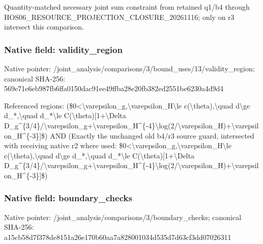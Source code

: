 \documentclass[10pt,a4paper]{article}
\begin{document}
\begingroup\raggedright\sloppy Quantity-matched necessary joint sum constraint from retained q1/\allowbreak{}b4 through HOS06\_\allowbreak{}RESOURCE\_\allowbreak{}PROJECTION\_\allowbreak{}CLOSURE\_\allowbreak{}20261116;\allowbreak{} only on r3 intersect this comparison.\par\endgroup

\subsubsection{Native field: validity\_\allowbreak{}region}
Native pointer: /joint\_\allowbreak{}analysis/comparisons/3/bound\_\allowbreak{}uses/13/validity\_\allowbreak{}region; canonical SHA-256: 569e71e6eb987fb6ffa0150dac91ee49ffba28e20fb382ed2551be6230a4d9d4

\begingroup\raggedright\sloppy Referenced regions:\allowbreak{} (\$0<\textbackslash{}varepsilon\_\allowbreak{}g,\allowbreak{}\textbackslash{}varepsilon\_\allowbreak{}H\textbackslash{}le c(\textbackslash{}theta),\allowbreak{}\textbackslash{}quad d\textbackslash{}ge d\_\allowbreak{}*,\allowbreak{}\textbackslash{}quad d\_\allowbreak{}*\textbackslash{}le C(\textbackslash{}theta)[1+\textbackslash{}Delta D\_\allowbreak{}g\textasciicircum{}\{3/\allowbreak{}4\}/\allowbreak{}\textbackslash{}varepsilon\_\allowbreak{}g+\textbackslash{}varepsilon\_\allowbreak{}H\textasciicircum{}\{-4\}\textbackslash{}log(2/\allowbreak{}\textbackslash{}varepsilon\_\allowbreak{}H)+\textbackslash{}varepsilon\_\allowbreak{}H\textasciicircum{}\{-3\}]\$) AND (Exactly the unchanged old b4/\allowbreak{}r3 source guard,\allowbreak{} intersected with receiving native r2 where used:\allowbreak{} \$0<\textbackslash{}varepsilon\_\allowbreak{}g,\allowbreak{}\textbackslash{}varepsilon\_\allowbreak{}H\textbackslash{}le c(\textbackslash{}theta),\allowbreak{}\textbackslash{}quad d\textbackslash{}ge d\_\allowbreak{}*,\allowbreak{}\textbackslash{}quad d\_\allowbreak{}*\textbackslash{}le C(\textbackslash{}theta)[1+\textbackslash{}Delta D\_\allowbreak{}g\textasciicircum{}\{3/\allowbreak{}4\}/\allowbreak{}\textbackslash{}varepsilon\_\allowbreak{}g+\textbackslash{}varepsilon\_\allowbreak{}H\textasciicircum{}\{-4\}\textbackslash{}log(2/\allowbreak{}\textbackslash{}varepsilon\_\allowbreak{}H)+\textbackslash{}varepsilon\_\allowbreak{}H\textasciicircum{}\{-3\}]\$)\par\endgroup

\subsubsection{Native field: boundary\_\allowbreak{}checks}
Native pointer: /joint\_\allowbreak{}analysis/comparisons/3/boundary\_\allowbreak{}checks; canonical SHA-256: a15cb58d7f378de8151a26e170b60aa7a828001034d535d7d63cf3dd07026311
\end{document}
